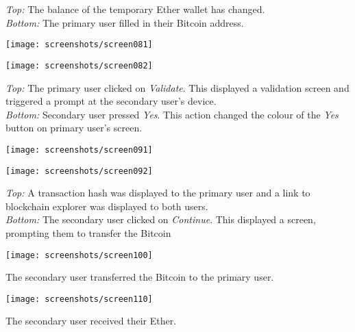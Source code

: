     \textit{Top:}    The balance of the temporary Ether wallet has changed.\\
    \textit{Bottom:} The primary user filled in their Bitcoin address.\\
    \centerline{\texttt{[image: screenshots/screen081]}}
    \centerline{\texttt{[image: screenshots/screen082]}}
    \textit{Top:}    The primary user clicked on \textit{Validate}. This displayed a validation screen and triggered a prompt at the secondary user's device.\\
    \textit{Bottom:} Secondary user pressed \textit{Yes}. This action changed the colour of the \textit{Yes} button on primary user's screen.\\
    \centerline{\texttt{[image: screenshots/screen091]}}
    \centerline{\texttt{[image: screenshots/screen092]}}
    \textit{Top:}    A transaction hash was displayed to the primary user and a link to blockchain explorer was displayed to both users.\\
    \textit{Bottom:} The secondary user clicked on \textit{Continue}. This displayed a screen, prompting them to transfer the Bitcoin\\    
    \centerline{\texttt{[image: screenshots/screen100]}}
    The secondary user transferred the Bitcoin to the primary user.\\
    \centerline{\texttt{[image: screenshots/screen110]}}
    The secondary user received their Ether.
    
